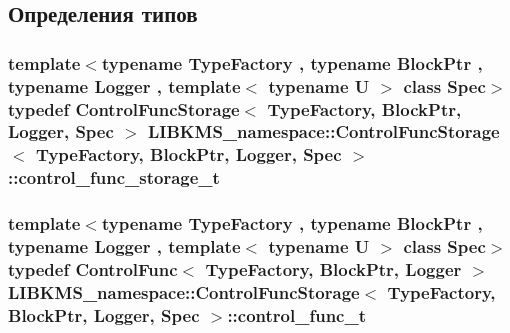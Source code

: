 \subsection{Определения типов}
\hypertarget{classLIBKMS__namespace_1_1ControlFuncStorage_ad9bffebc36d4a24c52884274e207ecd7}{
\subsubsection[{control\-\_\-func\-\_\-storage\-\_\-t}]{\setlength{\rightskip}{0pt plus 5cm}template$<$typename Type\-Factory , typename Block\-Ptr , typename Logger , template$<$ typename U $>$ class Spec$>$ typedef {\bf Control\-Func\-Storage}$<$ {\bf Type\-Factory}, Block\-Ptr, Logger, Spec $>$ {\bf L\-I\-B\-K\-M\-S\-\_\-namespace\-::\-Control\-Func\-Storage}$<$ {\bf Type\-Factory}, Block\-Ptr, Logger, Spec $>$\-::{\bf control\-\_\-func\-\_\-storage\-\_\-t}}}\label{classLIBKMS__namespace_1_1ControlFuncStorage_ad9bffebc36d4a24c52884274e207ecd7}
\hypertarget{classLIBKMS__namespace_1_1ControlFuncStorage_a69b15024d98e8df2ebe35447de1acd34}{
\subsubsection[{control\-\_\-func\-\_\-t}]{\setlength{\rightskip}{0pt plus 5cm}template$<$typename Type\-Factory , typename Block\-Ptr , typename Logger , template$<$ typename U $>$ class Spec$>$ typedef {\bf Control\-Func}$<$ {\bf Type\-Factory}, Block\-Ptr, Logger $>$ {\bf L\-I\-B\-K\-M\-S\-\_\-namespace\-::\-Control\-Func\-Storage}$<$ {\bf Type\-Factory}, Block\-Ptr, Logger, Spec $>$\-::{\bf control\-\_\-func\-\_\-t}}}\label{classLIBKMS__namespace_1_1ControlFuncStorage_a69b15024d98e8df2ebe35447de1acd34}


